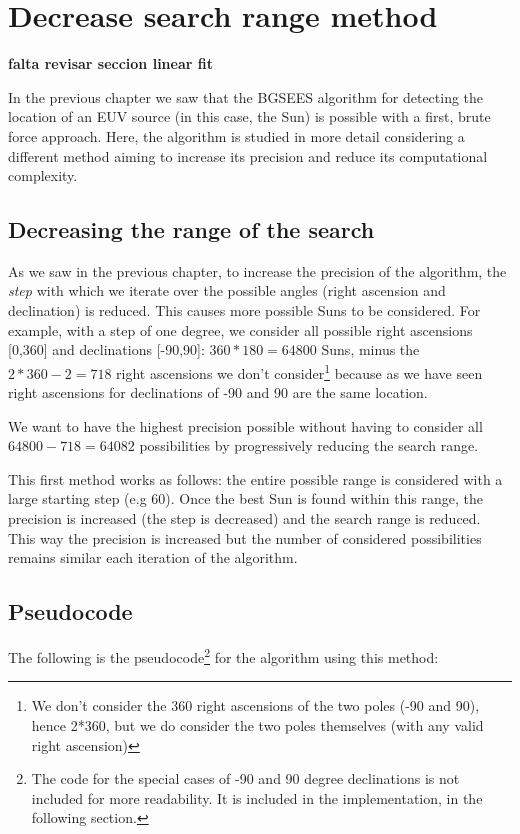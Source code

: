 \chapter{Decrease search range method}

\textbf{falta revisar seccion linear fit}

In the previous chapter we saw that the BGSEES algorithm for detecting the location of an EUV source (in this case, the Sun) is possible with a first, brute force approach. Here, the algorithm is studied in more detail considering a different method aiming to increase its precision and reduce its computational complexity.

\section{Decreasing the range of the search}

As we saw in the previous chapter, to increase the precision of the algorithm, the \textit{step} with which we iterate over the possible angles (right ascension and declination) is reduced. This causes more possible Suns to be considered. For example, with a step of one degree, we consider all possible right ascensions [0,360] and declinations [-90,90]: $360*180 = 64800$ Suns, minus the $2*360 - 2 = 718$ right ascensions we don't consider\footnote{We don't consider the 360 right ascensions of the two poles (-90 and 90), hence 2*360, but we do consider the two poles themselves (with any valid right ascension)} because as we have seen right ascensions for declinations of -90 and 90 are the same location.

We want to have the highest precision possible without having to consider all $64800 - 718 = 64082$ possibilities by progressively reducing the search range.

This first method works as follows: the entire possible range is considered with a large starting step (e.g 60). Once the best Sun is found within this range, the precision is increased (the step is decreased) and the search range is reduced. This way the precision is increased but the number of considered possibilities remains similar each iteration of the algorithm.

\section{Pseudocode}

The following is the pseudocode\footnote{The code for the special cases of -90 and 90 degree declinations is not included for more readability. It is included in the implementation, in the following section.} for the algorithm using this method:


